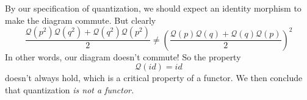 By our specification of quantization, we should expect an
identity morphism to make the diagram commute. But clearly
\begin{equation}%
 \frac{\mathcal{Q}(p^{2})\mathcal{Q}(q^{2})+\mathcal{Q}(q^{2})\mathcal{Q}(p^{2})}{2}
 \neq \left(\frac{\mathcal{Q}(p)\mathcal{Q}(q)+\mathcal{Q}(q)\mathcal{Q}(p)}{2}\right)^{2}
\end{equation}
In other words, our diagram doesn't commute! So the property
\begin{equation}%
\mathcal{Q}(id)=id
\end{equation}
doesn't always hold, which is a critical property of a
functor. We then conclude that quantization \emph{is not a functor.} 
